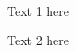 \documentclass{res_format}
\begin{document}
 
%  
\coverletterheader \\

Text 1 here

Text 2 here

\noindent\coverletterfooter
\end{document}
